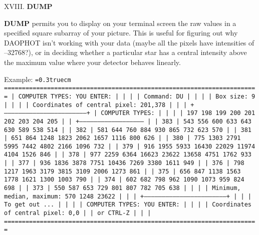 \vfill
\eject
\noindent XVIII.  {\bf DUMP}

{\bf DUMP} permits you to display on your terminal screen the raw
values in a specified square subarray of your picture.  This is useful
for figuring out why DAOPHOT isn't working with your data (maybe all
the pixels have intensities of --32768?), or in deciding whether a
particular star has a central intensity above the maximum value where
your detector behaves linearly.

\bigskip
\noindent Example:
\bigskip
{\noindent\obeylines\obeyspaces\frenchspacing\tt\baselineskip=0.3truecm
=======================================================================
| COMPUTER TYPES:                                  YOU ENTER:         |
|                                                                     |
| Command:                                         DU                 |
|                                                                     |
|                                   Box size:      9                  |
|                                                                     |
|               Coordinates of central pixel:      201,378            |
|                                                                     |
+---------------------------------------------------------------------+
| COMPUTER TYPES:                                                     |
|                                                                     |
|               197   198   199   200   201   202   203   204   205   |
|           +------------------------------------------------------   |
|       383 |   543   556   600   633   643   630   589   538   514   |
|       382 |   581   644   760   884   930   865   732   623   570   |
|       381 |   651   864  1248  1823  2062  1657  1116   800   626   |
|       380 |   775  1303  2791  5995  7442  4802  2166  1096   732   |
|       379 |   916  1955  5933 16430 22029 11974  4104  1526   846   |
|       378 |   977  2259  6364 16623 23622 13658  4751  1762   933   |
|       377 |   936  1836  3878  7751 10436  7269  3380  1611   949   |
|       376 |   798  1217  1963  3179  3815  3109  2006  1273   861   |
|       375 |   656   847  1138  1563  1778  1621  1300  1003   790   |
|       374 |   602   682   798   962  1090  1073   959   824   698   |
|       373 |   550   587   653   729   801   807   782   705   638   |
|                                                                     |
|                   Minimum, median, maximum:    570   1248  23622    |
|                                                                     |
+---------------------------------------------------------------------+
|                                                                     |
| To get out ...                                                      |
|                                                                     |
| COMPUTER TYPES:                                      YOU ENTER:     |
|                                                                     |
|               Coordinates of central pixel:          0,0            |
|                                                   or CTRL-Z         |
|                                                                     |
=======================================================================
}
\bigskip

